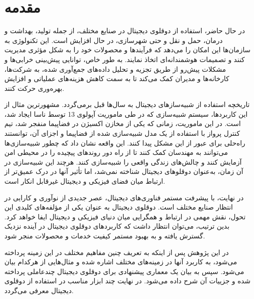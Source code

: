 \chapter{مقدمه}


در حال حاضر، استفاده از دوقلوی دیجیتال در صنایع مختلف، از جمله تولید، بهداشت و درمان، حمل و نقل و حتی شهرسازی، در حال افزایش است. این تکنولوژی به سازمان‌ها این امکان را می‌دهد که فرآیندها و محصولات خود را به شکل مؤثری مدیریت کنند و تصمیمات هوشمندانه‌ای اتخاذ نمایند. به طور خاص، توانایی پیش‌بینی خرابی‌ها و مشکلات پیش‌رو از طریق تجزیه و تحلیل داده‌های جمع‌آوری شده، به شرکت‌ها، کارخانه‌ها و مدیران کمک می‌کند تا به سمت کاهش هزینه‌های عملیاتی و افزایش بهره‌وری حرکت کنند.


تاریخچه استفاده از شبیه‌ساز‌های دیجیتال به سال‌ها قبل برمی‌گردد. مشهورترین مثال از این کاربردها، سیستم شبیه‌سازی که در طی ماموریت آپولوی 13 توسط ناسا ایجاد شد، است. در این ماموریت، زمانی که یکی از مخازن اکسیژن در فضاپیما منفجر شد، تیم کنترل پرواز با استفاده از یک مدل شبیه‌سازی شده از فضاپیما و اجزای آن، توانستند راه‌حلی برای عبور از این مشکل پیدا کنند. این واقعه نشان داد که چطور شبیه‌سازی‌ها می‌توانند به مهندسان کمک کنند تا از راه دور روندهای پیچیده را در محیطی امن آزمایش کنند و چالش‌های زندگی واقعی را شبیه‌سازی کنند. هرچند این شبیه‌سازی در آن زمان، به‌عنوان دوقلوهای دیجیتال شناخته نمی‌شد، اما تأثیر آنها در درک عمیق‌تر از ارتباط میان فضای فیزیکی و دیجیتال غیرقابل انکار است.
\cite{b3}

در نهایت، با پیشرفت مستمر فناوری‌های دیجیتال، عصر جدیدی از نوآوری و کارایی در انتظار صنایع مختلف است. دوقلوی دیجیتال به عنوان یکی از مؤلفه‌های کلیدی این تحول، نقش مهمی در ارتباط و همگرایی میان دنیای فیزیکی و دیجیتال ایفا خواهد کرد. بدین ترتیب، می‌توان انتظار داشت که کاربردهای دوقلوی دیجیتال در آینده نزدیک گسترش یافته و به بهبود مستمر کیفیت خدمات و محصولات منجر شود.

در این پژوهش پس از اینکه به تعریف چنین مفاهیم مختلف در این زمینه پرداخته می‌شود، به کاربرد آنها در زمینه‌های مختلف اشاره شده و مثال‌هایی از هرکدام بیان می‌شود. سپس به بیان یک معماری پیشنهادی برای دوقلوی دیجیتال چندعاملی پرداخته شده و جزییات آن شرح داده می‌شود. در نهایت چند ابزار مناسب در استفاده از دوقلوی دیجیتال معرفی می‌گردد.


